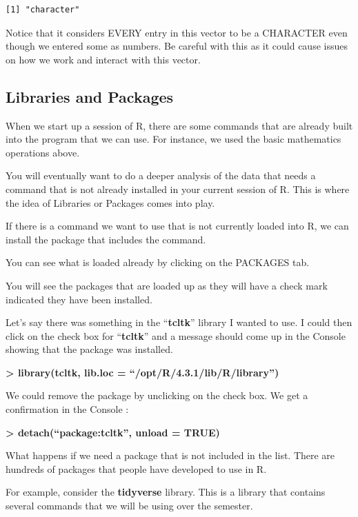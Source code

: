 \documentclass[
  letterpaper,
  DIV=11,
  numbers=noendperiod]{scrreprt}
\begin{document}
\begin{verbatim}
[1] "character"
\end{verbatim}

Notice that it considers EVERY entry in this vector to be a CHARACTER
even though we entered some as numbers. Be careful with this as it could
cause issues on how we work and interact with this vector.

\subsection*{Libraries and Packages}\label{libraries-and-packages}

When we start up a session of R, there are some commands that are
already built into the program that we can use. For instance, we used
the basic mathematics operations above.

You will eventually want to do a deeper analysis of the data that needs
a command that is not already installed in your current session of R.
This is where the idea of Libraries or Packages comes into play.

If there is a command we want to use that is not currently loaded into
R, we can install the package that includes the command.

You can see what is loaded already by clicking on the PACKAGES tab.

You will see the packages that are loaded up as they will have a check
mark indicated they have been installed.

Let's say there was something in the ``\textbf{tcltk}'' library I wanted
to use. I could then click on the check box for ``\textbf{tcltk}'' and a
message should come up in the Console showing that the package was
installed.

\textbf{\textgreater{} library(tcltk, lib.loc =
``/opt/R/4.3.1/lib/R/library'')}

We could remove the package by unclicking on the check box. We get a
confirmation in the Console :

\textbf{\textgreater{} detach(``package:tcltk'', unload = TRUE)}

What happens if we need a package that is not included in the list.
There are hundreds of packages that people have developed to use in R.

For example, consider the \textbf{tidyverse} library. This is a library
that contains several commands that we will be using over the semester.
\end{document}
